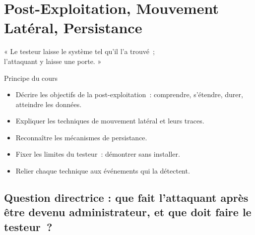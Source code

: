 
\chapter{Post-Exploitation, Mouvement Latéral, Persistance}
\label{chap:post}

\epigraph{%
    « Le testeur laisse le système tel qu'il l'a trouvé~;\\
    l'attaquant y laisse une porte. »%
}{Principe du cours}


\begin{boxobjectifs}
\begin{itemize}
    \item Décrire les objectifs de la post-exploitation~: comprendre,
          s'étendre, durer, atteindre les données.
    \item Expliquer les techniques de mouvement latéral et leurs traces.
    \item Reconnaître les mécanismes de persistance.
    \item Fixer les limites du testeur~: démontrer sans installer.
    \item Relier chaque technique aux événements qui la détectent.
\end{itemize}
\end{boxobjectifs}

\bigskip

\section*{Question directrice : que fait l'attaquant après être devenu administrateur, et que doit faire le testeur~?}

